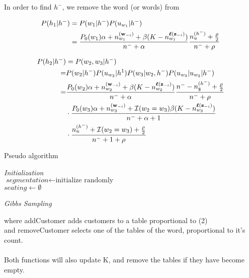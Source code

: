 In order to find $h^-$, we remove the word (or words) from 

\begin{align}
P(h_1 | h^-) &= P(w_1|h^-)P(u_{w_1} | h^{-}) \\
&= \dfrac{P_0(w_1)\alpha + n_{w_1}^{(\bm{\mathbf{w}}_{-i})}+ \beta (K - n_{w_1}^{\bm{\mathbf{\ell}}(\bm{\mathbf{z}}_{-i})})}{n^- + \alpha}
\dfrac{n_u^{(h^-)} + \frac{\rho}{2}}{n^- + \rho}
\end{align}

\begin{align}
P(h_2 | h^-) &= P(w_2,w_3|h^-)\\
=&P(w_2|h^-)P(u_{w_2}|h^1)P(w_3 | w_2,h^-)P(u_{w_3}|u_{w_2}|h^-) \\
=& \dfrac{P_0(w_2)\alpha + n_{w_2}^{(\bm{\mathbf{w}}_{-i})}+ \beta (K - n_{w_2}^{\bm{\mathbf{\ell}}(\bm{\mathbf{z}}_{-i})})}{n^- + \alpha}
\dfrac{n^- - n_\$^{(h^-)} + \frac{\rho}{2}}{n^- + \rho} \\
&\cdot 
\dfrac{P_0(w_3)\alpha + n_{w_3}^{(\bm{\mathbf{w}}_{-i})}+ \mathcal{I}(w_2 = w_3) \beta (K - n_{w_3}^{\bm{\mathbf{\ell}}(\bm{\mathbf{z}}_{-i})})}{n^- + \alpha + 1} \\
&\cdot
\dfrac{n_u^{(h^-)} + \mathcal{I}(w_2 = w_3)  + \frac{\rho}{2}}{n^- + 1 + \rho}
\end{align}



\begin{algorithm}[H]
	\caption{Pseudo algorithm}
    \label{alg:quad}
    \nonl  \SetSideCommentLeft \emph{Initialization} \\
    $\textit{segmentation} \gets \text{initialize randomly}$ \\ 
    $seating \gets \emptyset$ \\
    
     
     \nonl \SetSideCommentLeft \emph{Gibbs Sampling}

  \end{algorithm}
  
  	
where addCustomer adds customers to a table proportional to (2) \\
and removeCustomer selects one of the tables of the word, proportional to it's count. \\
\\
Both functions will also update K, and remove the tables if they have become empty.